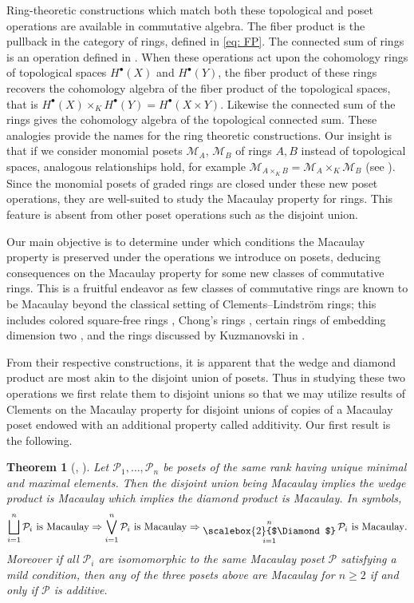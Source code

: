 \documentclass[11pt, reqno]{amsart}
\newcommand{\M}{{\mathcal M}}
\renewcommand{\P}{{\mathcal P}}
\theoremstyle{plain} %
\newtheorem{introthm}[introprop]{Theorem}
\theoremstyle{definition}
\theoremstyle{remark}
\numberwithin{equation}{section}  %
\DeclareMathOperator*{\bigdia}{\raisebox{-4pt}{\scalebox{2}{$\Diamond$}}}
\begin{document}
Ring-theoretic constructions which match both these topological and poset operations are available in commutative algebra. The fiber product is the pullback  in the category of rings, defined in \eqref{eq: FP}. The connected sum of rings is an operation defined in \cite{AAM}. When  these operations act upon the cohomology rings of topological spaces $H^\bullet(X)$ and $H^\bullet(Y)$, the fiber product of these rings recovers the cohomology algebra of the fiber product of the topological spaces, that is $H^\bullet(X)\times_K H^\bullet(Y)=H^\bullet(X\times Y)$. Likewise the connected sum of the rings gives the cohomology algebra of the topological connected sum. These analogies provide the names for the ring theoretic constructions.
Our  insight is that if we consider monomial posets $\M_A$, $\M_B$ of rings $A, B$ instead of topological spaces, analogous relationships hold, for example  $\M_{A\times_K B}=\M_A\times_K \M_B$ (see ).  Since the monomial posets of graded rings are closed under these new poset operations, they are well-suited to study the Macaulay property for  rings. This  feature is absent from other poset operations such as  the disjoint union.

Our main objective is to determine under which conditions the Macaulay property is preserved under the operations we introduce on posets, deducing  consequences on the Macaulay property for some new classes of commutative rings. This is a fruitful endeavor as  few  classes of commutative rings are known to be Macaulay beyond the classical setting of Clements--Lindstr\"om rings; this includes colored square-free rings \cite{MerminMurai}, Chong's rings \cite{Chong}, certain rings of embedding dimension two \cite{Abdelfatah}, and the rings discussed by Kuzmanovski in \cite{Kuz}.


From their respective constructions, it is apparent that the wedge and diamond product are most akin to the disjoint union of posets.  Thus in studying these two operations we first relate them to disjoint unions so that we may utilize results of Clements \cite{Clements} on the Macaulay property for disjoint unions of copies of a Macaulay poset endowed with an additional property called additivity. Our first  result is the following.

\begin{introthm}[, ]\label{introthmA}
Let $\P_1,\ldots, \P_n$ be posets of the same rank having unique minimal and maximal elements. Then the disjoint union being Macaulay implies the wedge product is Macaulay which implies the diamond product is Macaulay. In symbols,
\[
\bigsqcup_{i=1}^n\P_i \text{ is Macaulay} \Rightarrow \bigvee_{i=1}^n\P_i \text{ is Macaulay} \Rightarrow \bigdia_{i=1}^n\P_i \text{ is Macaulay}.
\]
Moreover if all $\P_i$ are isomomorphic to the same Macaulay poset $\P$ satisfying a mild condition, then any of the three posets above are Macaulay for $n\geq 2$ if and only if $\P$ is additive.
\end{introthm}
\end{document}
